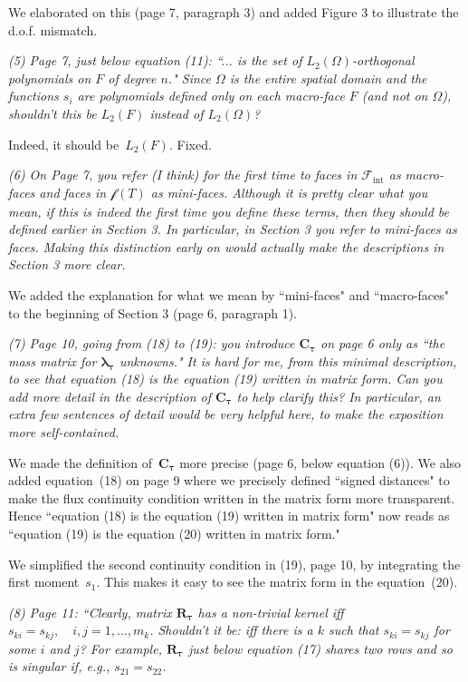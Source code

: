 \documentclass[12pt]{article}
\newcommand{\vect}[1]{\boldsymbol{\mathbf{#1}}}
\newcommand{\mfaces}[1][]{{\vect{\mathcal f}_{\text{#1}}}}
\newcommand{\bfaces}[1][]{{\vect{\mathcal F}_{\text{#1}}}}
\begin{document}
We elaborated on this (page 7, paragraph 3) and added Figure 3 to illustrate the d.o.f. mismatch.

\emph{(5) Page 7, just below equation (11): ``... is the set of $L_{2}\left(\Omega\right)$-orthogonal polynomials on $F$ of degree $n$." Since $\Omega$ is the entire spatial domain and the functions $s_{i}$ are polynomials defined only on each macro-face $F$ (and not on $\Omega$), shouldn't this be $L_{2}\left(F\right)$ instead of $L_{2}\left(\Omega\right)$?}

Indeed, it should be~$L_{2}\left(F\right)$. Fixed.

\emph{(6) On Page 7, you refer (I think) for the first time to faces in $\bfaces[int]$ as macro-faces and faces in $\mfaces(T)$ as mini-faces. Although it is pretty clear what you mean, if this is indeed the first time you define these terms, then they should be defined earlier in Section 3. In particular, in Section 3 you refer to mini-faces as faces. Making this distinction early on would actually make the descriptions in Section 3 more clear.}

We added the explanation for what we mean by ``mini-faces" and ``macro-faces" to the beginning of Section 3 (page 6, paragraph 1).

\emph{(7) Page 10, going from (18) to (19): you introduce $\mathbf{C}_{\boldsymbol{\tau}}$ on page 6 only as ``the mass matrix for $\vect \lambda_{\boldsymbol{\tau}}$ unknowns." It is hard for me, from this minimal description, to see that equation (18) is the equation (19) written in matrix form. Can you add more detail in the description of $\mathbf{C}_{\boldsymbol{\tau}}$ to help clarify this? In particular, an extra few sentences of detail would be very helpful here, to make the exposition more self-contained.}

We made the definition of~$\vect C_{\boldsymbol{\tau}}$ more precise (page 6, below equation (6)). We also added equation~(18) on page 9 where we precisely defined ``signed distances" to make the flux continuity condition written in the matrix form more transparent. Hence ``equation (18) is the equation (19) written in matrix form" now reads as ``equation (19) is the equation (20) written in matrix form."

We simplified the second continuity condition in (19), page 10, by integrating the first moment~$s_1$. This makes it easy to see the matrix form in the equation~(20).

\emph{(8) Page 11: ``Clearly, matrix $\mathbf{R}_{\boldsymbol{\tau}}$ has a non-trivial kernel iff $s_{ki}=s_{kj}, \quad i,j=1,\ldots,m_{k}$. Shouldn't it be: iff there is a $k$ such that $s_{ki}=s_{kj}$ for some $i$ and $j$? For example, $\mathbf{R}_{\boldsymbol{\tau}}$ just below equation (17) shares two rows and so is singular if, e.g., $s_{21}=s_{22}$.}
\end{document}
